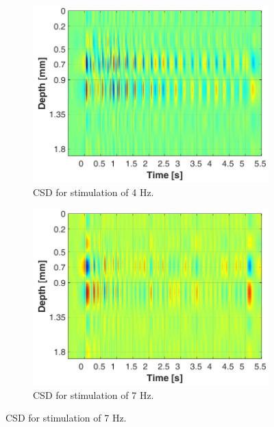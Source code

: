 \documentclass{pracalicmgr}
\begin{document}
\begin{figure}[H]
	\begin{subfigure}{.5\textwidth}
		\centering
		\includegraphics[width=1.\linewidth]{csd_4Hz_5s.png}
		\caption{CSD for stimulation of 4 Hz.}
		\label{rys:csd_4Hz}
	\end{subfigure}
	\begin{subfigure}{.5\textwidth}
		\centering
		\includegraphics[width=1.\linewidth]{csd_7Hz_5s.png}
		\caption{CSD for stimulation of 7 Hz.}
		\label{rys:csd_7Hz}
	\end{subfigure}
	
\end{figure}
\end{document}
